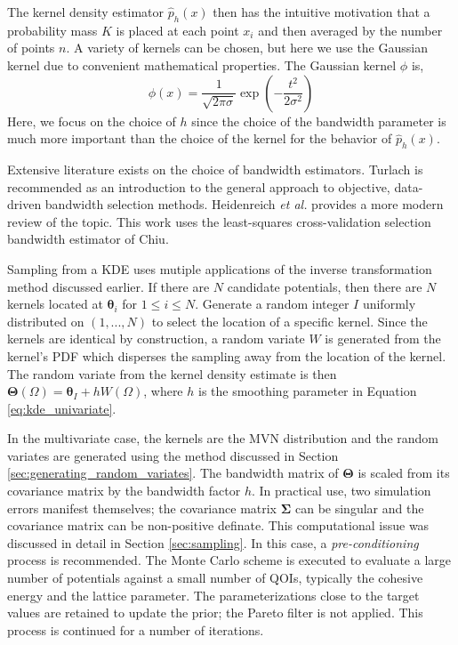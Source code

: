 The kernel density estimator $\hat{p}_h(x)$ then has the intuitive motivation that a probability mass $K$ is placed at each point $x_i$ and then averaged by the number of points $n$.  A variety of kernels can be chosen, but here we use the Gaussian kernel due to convenient mathematical properties.  The Gaussian kernel $\phi$ is,
\begin{equation}
  \phi(x)=\frac{1}{\sqrt{2\pi\sigma}}\exp{\left(-\frac{t^2}{2\sigma^2}\right)}
\end{equation}
Here, we focus on the choice of $h$ since the choice of the bandwidth parameter is much more important than the choice of the kernel for the behavior of $\hat{p}_h(x)$\cite{silverman1986_kde}.

Extensive literature exists on the choice of bandwidth estimators.  Turlach\cite{turlach1993_kde_bw} is recommended as an introduction to the general approach to objective, data-driven bandwidth selection methods.  Heidenreich \emph{et al.}\cite{heidenreich2013_kde_bw} provides a more modern review of the topic.  This work uses the least-squares cross-validation selection bandwidth estimator of Chiu\cite{chiu1991_kde_bw}.

Sampling from a KDE uses mutiple applications of the inverse transformation method discussed earlier.  If there are $N$ candidate potentials, then there are $N$ kernels located at $\bm{\theta}_i$ for $1 \leq i \leq N$.  Generate a random integer $I$ uniformly distributed on $(1,...,N)$ to select the location of a specific kernel.  Since the kernels are identical by construction, a random variate $W$ is generated from the kernel's PDF which disperses the sampling away from the location of the kernel.  The random variate from the kernel density estimate is then $\bm{\Theta}(\Omega) = \bm{\theta}_I + h W(\Omega)$, where $h$ is the smoothing parameter in Equation \ref{eq:kde_univariate}.

In the multivariate case, the kernels are the MVN distribution and the random variates are generated using the method discussed in Section \ref{sec:generating_random_variates}.  The bandwidth matrix of $\bm{\Theta}$ is scaled from its covariance matrix by the bandwidth factor $h$.  In practical use, two simulation errors manifest themselves; the covariance matrix $\bm{\Sigma}$ can be singular and the covariance matrix can be non-positive definate.  This computational issue was discussed in detail in Section \ref{sec:sampling}.  In this case, a \emph{pre-conditioning} process is recommended.  The Monte Carlo scheme is executed to evaluate a large number of potentials against a small number of QOIs, typically the cohesive energy and the lattice parameter.  The parameterizations close to the target values are retained to update the prior; the Pareto filter is not applied.  This process is continued for a number of iterations.

